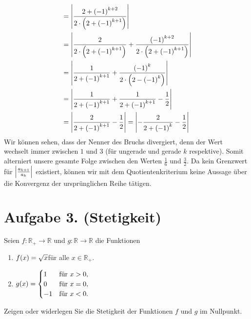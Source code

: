 \documentclass[german,12pt]{homework}
\newcommand{\RR}{\mathbb{R}}
\DeclarePairedDelimiter{\absolute}{\lvert}{\rvert}
\DeclarePairedDelimiter{\enbrace}{(}{)}
\begin{document}
\begin{itemize}
\begin{align*}
            &= \absolute*{\frac{2 + \enbrace*{-1}^{k + 2}}{2 \cdot \enbrace*{2 + \enbrace*{-1}^{k + 1}}}}\\
            &= \absolute*{\frac{2}{2 \cdot \enbrace*{2 + \enbrace*{-1}^{k + 1}}} + \frac{\enbrace*{-1}^{k + 2}}{2 \cdot \enbrace*{2 + \enbrace*{-1}^{k + 1}}}}\\
            &= \absolute*{\frac{1}{2 + \enbrace*{-1}^{k + 1}} + \frac{\enbrace*{-1}^k}{2 \cdot \enbrace*{2 - \enbrace*{-1}^k}}}\\
            &= \absolute*{\frac{1}{2 + \enbrace*{-1}^{k + 1}} + \frac{1}{2 + \enbrace*{-1}^{k + 1}} - \frac{1}{2}}\\
            &= \absolute*{\frac{2}{2 + \enbrace*{-1}^{k + 1}} - \frac{1}{2}} = \absolute*{-\frac{2}{2 + \enbrace*{-1}^k} - \frac{1}{2}}
        \end{align*}
        Wir können sehen, dass der Nenner des Bruchs divergiert, denn der Wert
        wechselt immer zwischen \(1\) und \(3\) (für ungerade und gerade \(k\) respektive). Somit alterniert unsere gesamte Folge zwischen den Werten
        \(\frac{1}{6}\) und \(\frac{3}{2}\). Da kein Grenzwert für \(\absolute*{\frac{a_{k + 1}}{a_k}}\) existiert, können wir mit dem Quotientenkriterium keine Aussage über die Konvergenz der ursprünglichen Reihe tätigen.
    \end{itemize}


    \section*{Aufgabe 3. (Stetigkeit)}

    \begin{problem}
        Seien \(f: \RR_+ \to \RR\) und \(g: \RR \to \RR\) die Funktionen
        \begin{enumerate}
            \item \(f\enbrace*{x} = \sqrt{x}\){\quad}für alle \(x \in \RR_+\).
            \item \(g\enbrace*{x} = \begin{cases}
                1 & \text{für }x > 0,\\
                0 & \text{für }x = 0,\\
                -1 & \text{für }x < 0.
            \end{cases}\)
        \end{enumerate}
        Zeigen oder widerlegen Sie die Stetigkeit der Funktionen \(f\) und \(g\)
        im Nullpunkt.
    \end{problem}
\end{document}
